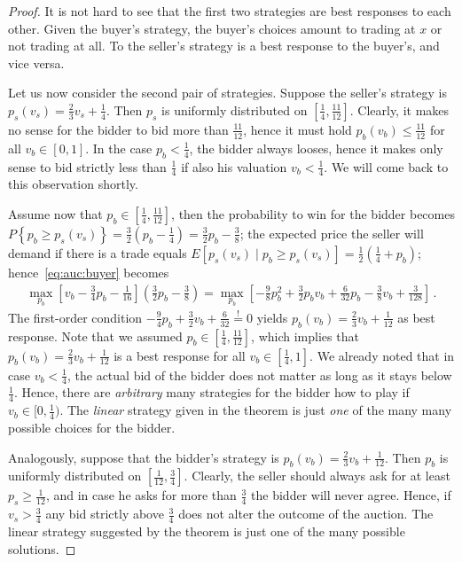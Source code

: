 \begin{proof}
It is not hard to see that the first two strategies are best responses to each other. Given the buyer's strategy, the buyer's choices amount to trading at $x$ or not trading at all. To the seller's strategy is a best response to the buyer's, and vice versa.

Let us now consider the second pair of strategies. Suppose the seller's strategy is $p_s(v_s) = \frac{2}{3} v_s + \frac{1}{4}$. Then $p_s$ is uniformly distributed on $[\frac{1}{4}, \frac{11}{12}]$. Clearly, it makes no sense for the bidder to bid more than $\frac{11}{12}$, hence it must hold $p_b(v_b) \leq \frac{11}{12}$ for all $v_b \in [0,1]$. In the case $p_b < \frac{1}{4}$, the bidder always looses, hence it makes only sense to bid strictly less than $\frac{1}{4}$ if also his valuation $v_b < \frac{1}{4}$. We will come back to this observation shortly.

Assume now that $p_b \in [\frac{1}{4}, \frac{11}{12}]$, then the probability to win for the bidder becomes $P \left\{p_b \geq p_s(v_s) \right\} = \frac{3}{2} \left(p_b - \frac{1}{4}\right) = \frac{3}{2} p_b - \frac{3}{8}$; the expected price the seller will demand if there is a trade equals $E\left[p_s(v_s) \mid p_b \geq p_s(v_s)\right] = \frac{1}{2} \left( \frac{1}{4} + p_b\right)$; hence~\eqref{eq:auc:buyer} becomes
\begin{align*}
 \max_{p_b} \left[ v_b - \frac{3}{4} p_b - \frac{1}{16} \right] \left( \frac{3}{2} p_b - \frac{3}{8} \right) = \max_{p_b} \left[- \frac{9}{8} p_b^2 + \frac{3}{2} p_b v_b + \frac{6}{32} p_b - \frac{3}{8} v_b + \frac{3}{128} \right] \,.
\end{align*}
The first-order condition $- \frac{9}{4} p_b + \frac{3}{2}v_b + \frac{6}{32}  \stackrel{!}{=} 0 $ yields $p_b(v_b)=\frac{2}{3} v_b + \frac{1}{12}$ as best response. Note that we assumed $p_b \in [\frac{1}{4}, \frac{11}{12}]$, which implies that $p_b(v_b)=\frac{2}{3} v_b + \frac{1}{12}$ is a best response for all $v_b \in [\frac{1}{4},1]$. We already noted that in case $v_b < \frac{1}{4}$, the actual bid of the bidder does not matter as long as it stays below $\frac{1}{4}$. Hence, there are \emph{arbitrary} many strategies for the bidder how to play if $v_b \in [0,\frac{1}{4})$. The \emph{linear} strategy given in the theorem is just \emph{one} of the many many possible choices for the bidder.

Analogously, suppose that the bidder's strategy is $p_b(v_b)=\frac{2}{3} v_b + \frac{1}{12}$. Then $p_b$ is uniformly distributed on $[\frac{1}{12},\frac{3}{4}]$. Clearly, the seller should always ask for at least $p_s \geq \frac{1}{12}$, and in case he asks for more than $\frac{3}{4}$ the bidder will never agree. Hence, if $v_s > \frac{3}{4}$ any bid strictly above $\frac{3}{4}$ does not alter the outcome of the auction. The linear strategy suggested by the theorem is just one of the many possible solutions.


\end{proof}
